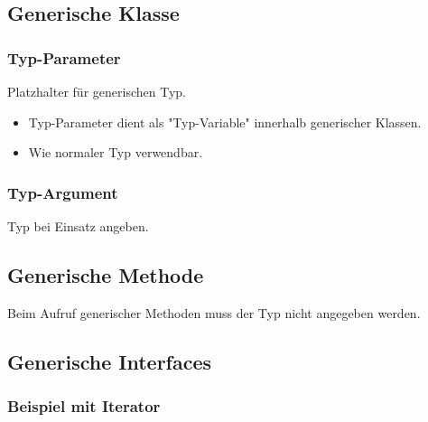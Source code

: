 \begin{minipage}[t]{0.51\columnwidth}
    \subsection{Generische Klasse}
    \subsubsection{Typ-Parameter}
    \raggedright%
    Platzhalter für generischen Typ.
    
    \begin{itemize}
        \item Typ-Parameter dient als "Typ-Variable" innerhalb generischer Klassen.
        \item Wie normaler Typ verwendbar.
    \end{itemize}
    \vspace{-0.8\abovedisplayskip}
    \subsubsection{Typ-Argument}
    Typ bei Einsatz angeben.
    
\end{minipage}\hfill%
\begin{minipage}[t]{0.48\columnwidth}
    \subsection{Generische Methode}
    
    \raggedright%
    Beim Aufruf generischer Methoden muss der Typ nicht angegeben werden.
    
    \vspace{0.8pt}
    \subsection{Generische Interfaces}
    \subsubsection{Beispiel mit Iterator}
    
    
\end{minipage}


